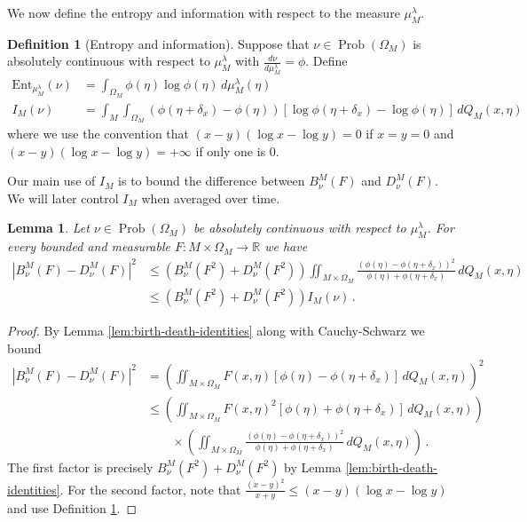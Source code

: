 \documentclass[11pt]{amsart}
\newtheorem{lemma}[theorem]{Lemma}
\theoremstyle{definition}
\newtheorem{definition}[theorem]{Definition}
\theoremstyle{remark}
\newcommand{\R}{\mathbb{R}}
\newcommand{\Prob}{\operatorname{Prob}}
\begin{document}
We now define the entropy and information with respect to the measure $\mu_M^\lambda$.

\begin{definition}[Entropy and information]\label{def:entropy-and-information}
    Suppose that $\nu \in \Prob(\Omega_M)$ is absolutely continuous with respect to $\mu_M^{\lambda}$ with $\frac{d\nu}{d\mu_M^{\lambda}} = \phi$.  Define \begin{align*}
        \mathrm{Ent}_{\mu_M^{\lambda}}(\nu) &= \int_{\Omega_M} \phi(\eta) \log \phi(\eta) \, d\mu_M^{\lambda}(\eta) \\
        I_M(\nu) &=  \int_M \int_{\Omega_M} \left(\phi(\eta + \delta_x) - \phi(\eta) \right)\left[\log \phi(\eta + \delta_x) - \log \phi(\eta) \right] \,dQ_M(x,\eta)
    \end{align*}
    where we use the convention that $(x - y)(\log x - \log y) = 0$ if $x = y = 0$ and $(x - y)(\log x - \log y) = +\infty$ if only one is $0$.
\end{definition}






Our main use of $I_M$ is to bound the difference between $B_\nu^M(F)$ and $D_\nu^M(F)$.  We will later control $I_M$ when averaged over time. \begin{lemma}\label{lem:finite-volume-difference}
    Let $\nu \in \Prob(\Omega_M)$ be absolutely continuous with respect to $\mu_M^\lambda$.  For every bounded and measurable $F: M \times \Omega_M \to \R$ we have \begin{align*}
        |B_\nu^M(F) - D_\nu^M(F)|^2 &\leq \left(B_\nu^M(F^2) + D_\nu^M(F^2) \right) \iint_{M \times \Omega_M} \frac{(\phi(\eta) - \phi(\eta + \delta_x))^2}{\phi(\eta) + \phi(\eta + \delta_x)} \,dQ_M(x,\eta) \\
        &\leq  \left(B_\nu^M(F^2) + D_\nu^M(F^2) \right) I_M(\nu)\,.
    \end{align*}
\end{lemma}
\begin{proof}
    By Lemma \ref{lem:birth-death-identities} along with Cauchy-Schwarz we bound \begin{align*}
        |B_\nu^M(F) - D_\nu^M(F)|^2 &= \left(\iint_{M \times \Omega_M} F(x,\eta)[\phi(\eta) - \phi(\eta + \delta_x)] \,dQ_M(x,\eta)\right)^2 \\
        &\leq \left(\iint_{M \times \Omega_M} F(x,\eta)^2[\phi(\eta) + \phi(\eta + \delta_x)] \,dQ_M(x,\eta)\right) \\
        &\qquad \times\left(\iint_{M \times \Omega_M} \frac{(\phi(\eta) - \phi(\eta + \delta_x))^2}{\phi(\eta) + \phi(\eta + \delta_x)} \,dQ_M(x,\eta)\right)\,. 
    \end{align*}
    The first factor is precisely $B_\nu^M(F^2) + D_\nu^M(F^2)$ by Lemma \ref{lem:birth-death-identities}.  For the second factor, note that $\frac{(x - y)^2}{x + y} \leq (x - y)(\log x - \log y)$ and use Definition \ref{def:entropy-and-information}.
\end{proof}
\end{document}
